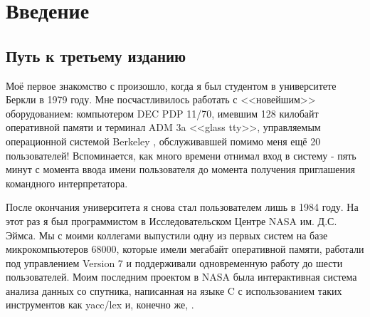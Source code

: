 \chapter*{Введение}
\section*{Путь к третьему изданию}

Моё первое знакомство с \GNUmake{} произошло, когда я был студентом в
университете Беркли в 1979 году. Мне посчастливилось работать с
<<новейшим>> оборудованием: компьютером DEC PDP 11/70, имевшим 128
килобайт оперативной памяти и терминал ADM 3a <<glass tty>>,
управляемым операционной системой Berkeley \UNIX{}, обслуживавшей
помимо меня ещё 20 пользователей!  Вспоминается, как много времени
отнимал вход в систему - пять минут с момента ввода имени пользователя
до момента получения приглашения командного интерпретатора.

После окончания университета я снова стал пользователем \UNIX{} лишь в
1984 году.  На этот раз я был программистом в Исследовательском Центре
NASA им. Д.С. Эймса.  Мы с моими коллегами выпустили одну из первых
систем \UNIX{} на базе микрокомпьютеров 68000, которые имели мегабайт
оперативной памяти, работали под управлением \UNIX{} Version 7 и
поддерживали одновременную работу до шести пользователей. Моим
последним проектом в NASA была интерактивная система анализа данных со
спутника, написанная на языке C с использованием таких инструментов
как yacc/lex и, конечно же, \GNUmake{}.

